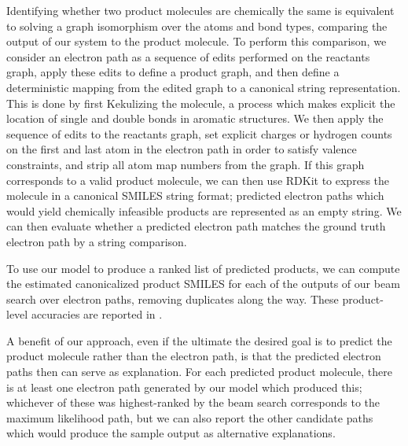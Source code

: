 Identifying whether two product molecules are chemically the same is equivalent to solving a graph isomorphism over the atoms and bond types, comparing the output of our system to the product molecule.
To perform this comparison, we consider an electron path as a sequence of edits performed on the reactants graph, apply these edits to define a product graph, 
and then define a deterministic mapping from the edited graph to a canonical string representation.
This is done by first Kekulizing the molecule, a process which makes explicit the location of single and double bonds in aromatic structures.
We then apply the sequence of edits to the reactants graph,
set explicit charges or hydrogen counts on the first and last atom in the electron path in order to satisfy valence constraints,
and strip all atom map numbers from the graph.
If this graph corresponds to a valid product molecule, we can then use RDKit to express the molecule in a canonical SMILES string format;
predicted electron paths which would yield chemically infeasible products are represented as an empty string.
We can then evaluate whether a predicted electron path matches the ground truth electron path by a string comparison.

To use our model to produce a ranked list of predicted products, we can compute the estimated canonicalized product SMILES for each of the outputs of our beam search over electron paths, removing duplicates along the way. 
These product-level accuracies are reported in .

A benefit of our approach, even if the ultimate the desired goal is to predict the product molecule rather than the electron path,
is that the predicted electron paths then can serve as explanation.
For each predicted product molecule, there is at least one electron path generated by our model which produced this;
whichever of these was highest-ranked by the beam search corresponds to the maximum likelihood path, 
but we can also report the other candidate paths which would produce the sample output as alternative explanations.



